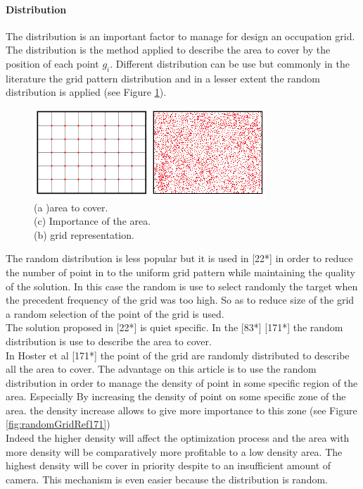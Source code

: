 \paragraph*{ Distribution}
The distribution is an important factor to manage for design an occupation grid. The distribution is the method applied to describe the area to cover by the position of each point $g_i$.
Different distribution can be use but commonly in the literature the grid pattern distribution and in a lesser extent the random distribution is applied (see Figure \ref{fig:GridVsRand}). \\
\begin{figure}[t!]
   \includegraphics[width=\linewidth]{img/GridVsRand.png}
  \caption{ (a )area  to cover.\\   
(c) Importance of the area.\\  
(b) grid representation.}\label{fig:GridVsRand}
  \endminipage\hfill
\end{figure}
The random distribution is less popular but it is used in [22*] in order to reduce the number of point in to the uniform grid pattern while maintaining the quality of the solution. In this case the random is use to select randomly the target when the precedent frequency of the grid was too high. So as to reduce size of the grid a random selection of the point of the grid is used. \\
The solution proposed in [22*] is quiet specific. In the [83*] [171*] the random distribution is use to describe the area to cover. \\
In Hoster et al [171*] the point of the grid are randomly distributed to describe all the area to cover. The advantage on this article is to use the random distribution in order to  manage the density of point in some specific region of the area. Especially By increasing the density of point on some specific zone of the area. the density increase allows to give more importance to this zone (see Figure \ref{fig:randomGridRef171})\\
Indeed the higher density will affect the optimization process and the area with more density will be comparatively  more profitable to a low density area. The highest density will be cover in priority despite to an insufficient amount of camera. This mechanism  is  even easier because the distribution is random.

